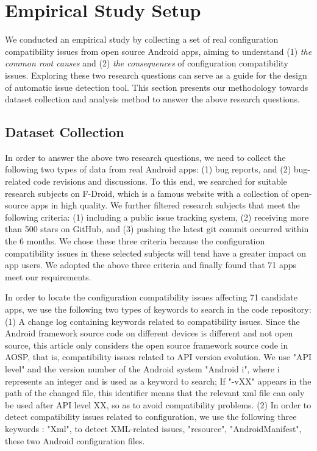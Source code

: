 \section{Empirical Study Setup}
We conducted an empirical study by collecting a set of real configuration compatibility issues from open source Android apps, aiming to understand (1) \textit{the common root causes} and (2) \textit{the consequences} of configuration compatibility issues. 
Exploring these two research questions can serve as a guide for the design of automatic issue detection tool. 
This section presents our methodology towards dataset collection and analysis method to answer the above research questions.

\subsection{Dataset Collection}
In order to answer the above two research questions, we need to collect the following two types of data from real Android apps: (1) bug reports, and (2) bug-related code revisions and discussions. 
To this end, we searched for suitable research subjects on F-Droid\cite{fdroid}, which is a famous website with a collection of open-source apps in high quality. 
We further filtered research subjects that meet the following criteria: (1) including a public issue tracking system, (2) receiving more than 500 stars on GitHub, and (3) pushing the latest git commit occurred within the 6 months. 
We chose these three criteria because the configuration compatibility issues in these selected subjects will tend have a greater impact on app users. 
We adopted the above three criteria and finally found that 71 apps meet our requirements.

In order to locate the configuration compatibility issues affecting 71 candidate apps, we use the following two types of keywords to search in the code repository: 
(1) A change log containing keywords related to compatibility issues. Since the Android framework source code on different devices is different and not open source, this article only considers the open source framework source code in AOSP, that is, compatibility issues related to API version evolution. We use "API level" and the version number of the Android system "Android i", where i represents an integer and is used as a keyword to search; If "-vXX" appears in the path of the changed file, this identifier means that the relevant xml file can only be used after API level XX, so as to avoid compatibility problems.
(2) In order to detect compatibility issues related to configuration, we use the following three keywords : "Xml", to detect XML-related issues, "resource", "AndroidManifest", these two Android configuration files.

